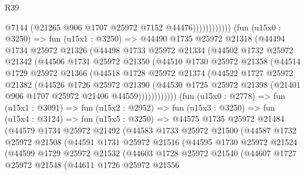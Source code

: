 \begin{lexlean}{R39}
\begin{coremodule}
                              @7144
                              (@21265 @906 @1707 @25972 @7152 @44476))))))))))))
        (fun (u15x0 : @3250) =>
        fun (u15x1 : @3250) =>
        @44490
          @1735
          @25972
          @21318
          (@44494
            @1734
            @25972
            @21326
            (@44498
              @1733
              @25972
              @21334
              (@44502
                @1732
                @25972
                @21342
                (@44506
                  @1731
                  @25972
                  @21350
                  (@44510
                    @1730
                    @25972
                    @21358
                    (@44514
                      @1729
                      @25972
                      @21366
                      (@44518
                        @1728
                        @25972
                        @21374
                        (@44522
                          @1727
                          @25972
                          @21382
                          (@44526
                            @1726
                            @25972
                            @21390
                            (@44530
                              @1725
                              @25972
                              @21398
                              (@21401 @906 @1707 @25972 @21406 @44559))))))))))))
        (fun (u15x0 : @2778) =>
        fun (u15x1 : @3091) =>
        fun (u15x2 : @2952) =>
        fun (u15x3 : @3250) =>
        fun (u15x4 : @3124) =>
        fun (u15x5 : @3250) =>
        @44575
          @1735
          @25972
          @21484
          (@44579
            @1734
            @25972
            @21492
            (@44583
              @1733
              @25972
              @21500
              (@44587
                @1732
                @25972
                @21508
                (@44591
                  @1731
                  @25972
                  @21516
                  (@44595
                    @1730
                    @25972
                    @21524
                    (@44599
                      @1729
                      @25972
                      @21532
                      (@44603
                        @1728
                        @25972
                        @21540
                        (@44607
                          @1727
                          @25972
                          @21548
                          (@44611
                            @1726
                            @25972
                            @21556

\end{coremodule}
\end{lexlean}
